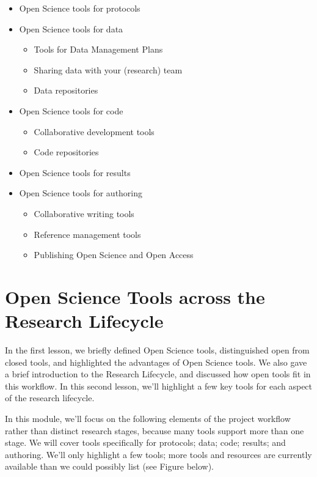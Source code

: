 \documentclass[
  letterpaper,
  DIV=11,
  numbers=noendperiod]{scrreport}
\providecommand{\tightlist}{%
  \setlength{\itemsep}{0pt}\setlength{\parskip}{0pt}}\usepackage{longtable,booktabs,array}
\begin{document}
\begin{itemize}
\tightlist
\item
  Open Science tools for protocols
\item
  Open Science tools for data

  \begin{itemize}
  \tightlist
  \item
    Tools for Data Management Plans
  \item
    Sharing data with your (research) team
  \item
    Data repositories
  \end{itemize}
\item
  Open Science tools for code

  \begin{itemize}
  \tightlist
  \item
    Collaborative development tools
  \item
    Code repositories
  \end{itemize}
\item
  Open Science tools for results
\item
  Open Science tools for authoring

  \begin{itemize}
  \tightlist
  \item
    Collaborative writing tools
  \item
    Reference management tools
  \item
    Publishing Open Science and Open Access
  \end{itemize}
\end{itemize}

\hypertarget{open-science-tools-across-the-research-lifecycle-1}{%
\section{Open Science Tools across the Research
Lifecycle}\label{open-science-tools-across-the-research-lifecycle-1}}

In the first lesson, we briefly defined Open Science tools,
distinguished open from closed tools, and highlighted the advantages of
Open Science tools. We also gave a brief introduction to the Research
Lifecycle, and discussed how open tools fit in this workflow. In this
second lesson, we'll highlight a few key tools for each aspect of the
research lifecycle.

In this module, we'll focus on the following elements of the project
workflow rather than distinct research stages, because many tools
support more than one stage. We will cover tools specifically for
protocols; data; code; results; and authoring. We'll only highlight a
few tools; more tools and resources are currently available than we
could possibly list (see Figure below).
\end{document}
